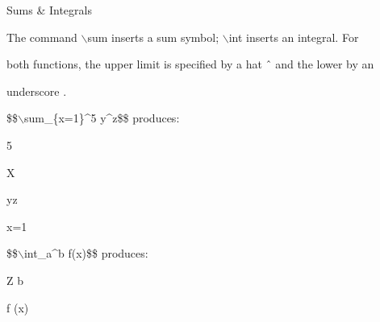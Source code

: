\documentclass[a4paper,portrait,12pt]{article}
\begin{document}
\begin{flushleft}
Sums \& Integrals
\end{flushleft}





\begin{flushleft}
The command \ensuremath{\backslash}sum inserts a sum symbol; \ensuremath{\backslash}int inserts an integral. For
\end{flushleft}


\begin{flushleft}
both functions, the upper limit is specified by a hat ˆ and the lower by an
\end{flushleft}


\begin{flushleft}
underscore .
\end{flushleft}


\begin{flushleft}
\$\$\ensuremath{\backslash}sum\_\{x=1\}\^{}5 y\^{}z\$\$ produces:
\end{flushleft}


5


\begin{flushleft}
X
\end{flushleft}





\begin{flushleft}
yz
\end{flushleft}





\begin{flushleft}
x=1
\end{flushleft}





\begin{flushleft}
\$\$\ensuremath{\backslash}int\_a\^{}b f(x)\$\$ produces:
\end{flushleft}


\begin{flushleft}
Z b
\end{flushleft}





\begin{flushleft}
f (x)
\end{flushleft}
\end{document}

